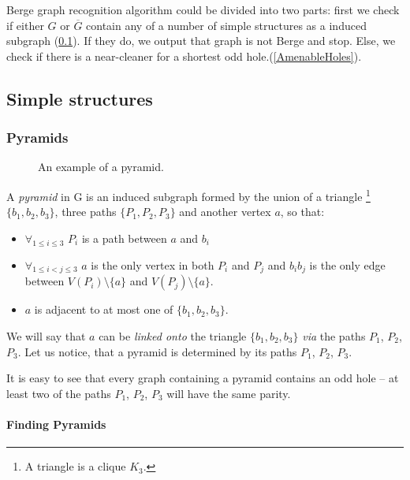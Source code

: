 \documentclass{report}
\begin{document}
Berge graph recognition algorithm could be divided into two parts: first we check if either $G$ or $\overline{G}$ contain any of a number of simple structures as a induced subgraph (\ref{SimpleStructures}). If they do, we output that graph is not Berge and stop. Else, we check if there is a near-cleaner for a shortest odd hole.(\ref{AmenableHoles}).

\subsection{Simple structures}
\label{SimpleStructures}

\subsubsection{Pyramids}


\begin{wrapfigure}{r}{0.35\textwidth}
	
	\caption{An example  of a pyramid.}%
	\vspace{-1.2cm}
\end{wrapfigure}

A \emph{pyramid} in G is an induced subgraph formed by the union of a triangle \footnote{A triangle is a clique $K_3$.} $\{b_1,b_2,b_3\}$, three paths $\{P_1, P_2, P_3\}$ and another vertex $a$, so that:
\begin{itemize}
	\item $\forall_{1\leq i \leq 3}$ $P_i$ is a path between $a$ and $b_i$
	\item $\forall_{1\leq i < j \leq 3}$ $a$ is the only vertex in both $P_i$ and $P_j$ and $b_ib_j$ is the only edge between $V(P_i)\setminus\{a\}$ and $V(P_j)\setminus\{a\}$.
	\item $a$ is adjacent to at most one of $\{b_1, b_2, b_3\}$.
\end{itemize}

We will say that $a$ can be \emph{linked onto} the triangle $\{b_1, b_2, b_3\}$ \emph{via} the paths $P_1$, $P_2$, $P_3$. Let us notice, that a pyramid is determined by its paths $P_1$, $P_2$, $P_3$.

It is easy to see that every graph containing a pyramid contains an odd hole -- at least two of the paths $P_1$, $P_2$, $P_3$ will have the same parity.

\paragraph{Finding Pyramids}
\end{document}
